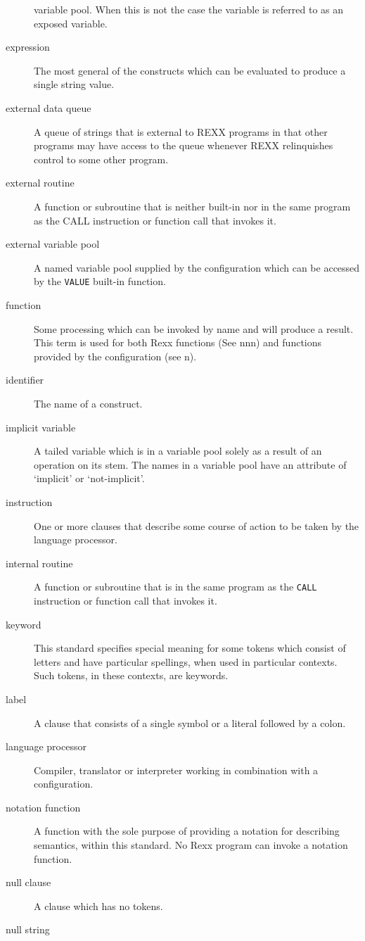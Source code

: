 \begin{description}
variable pool. When this is not the case the variable is referred to as
an exposed variable.
\item[expression]
The most general of the constructs which can be evaluated to produce a
single string value.
\item[external data queue]
A queue of strings that is external to REXX programs in that other
programs may have access to the queue whenever REXX relinquishes control
to some other program.
\item[external routine]
A function or subroutine that is neither built-in nor in the same
program as the CALL instruction or function call that invokes it.
\item[external variable pool]
A named variable pool supplied by the configuration which can be
accessed by the \texttt{VALUE} built-in function.
\item[function]
Some processing which can be invoked by name and will produce a result.
This term is used for both Rexx functions (See nnn) and functions
provided by the configuration (see n).
\item[identifier]
The name of a construct.
\item[implicit variable]
A tailed variable which is in a variable pool solely as a result of an
operation on its stem. The names in a variable pool have an attribute of
`implicit' or `not-implicit'.
\item[instruction]
One or more clauses that describe some course of action to be taken by
the language processor.
\item[internal routine]
A function or subroutine that is in the same program as the
\texttt{CALL} instruction or function call that invokes it.
\item[keyword]
This standard specifies special meaning for some tokens which consist of
letters and have particular spellings, when used in particular contexts.
Such tokens, in these contexts, are keywords.
\item[label]
A clause that consists of a single symbol or a literal followed by a
colon.
\item[language processor]
Compiler, translator or interpreter working in combination with a
configuration.
\item[notation function]
A function with the sole purpose of providing a notation for describing
semantics, within this standard. No Rexx program can invoke a notation
function.
\item[null clause]
A clause which has no tokens.
\item[null string]

\end{description}
